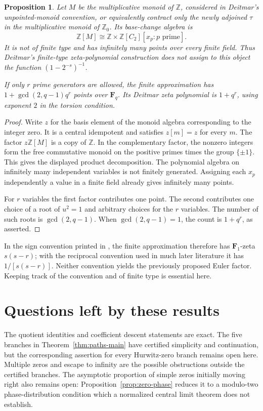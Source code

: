 \documentclass[11pt]{article}
\newcommand{\Z}{\mathbb Z}\newcommand{\N}{\mathbb N}\newcommand{\Q}{\mathbb Q}
\newtheorem{proposition}[theorem]{Proposition}
\theoremstyle{definition}\newtheorem{definition}[theorem]{Definition}
\begin{document}
\begin{proposition}\label{prop:deitmar}
Let $M$ be the multiplicative monoid of $\Z$, considered in Deitmar's unpointed-monoid convention, or equivalently contract only the newly adjoined $\tau$ in the multiplicative monoid of $\Z_0$. Its base-change algebra is
\[
 \Z[M]\cong\Z\times\Z[C_2][x_p:p\text{ prime}].
\]
It is not of finite type and has infinitely many points over every finite field. Thus Deitmar's finite-type zeta-polynomial construction does not assign to this object the function $(1-2^{-s})^{-1}$.

If only $r$ prime generators are allowed, the finite approximation has $1+\gcd(2,q-1)q^r$ points over $\mathbf F_q$. Its Deitmar zeta polynomial is $1+q^r$, using exponent $2$ in the torsion condition.
\end{proposition}
\begin{proof}
Write $z$ for the basis element of the monoid algebra corresponding to the integer zero. It is a central idempotent and satisfies $z[m]=z$ for every $m$. The factor $z\Z[M]$ is a copy of $\Z$. In the complementary factor, the nonzero integers form the free commutative monoid on the positive primes times the group $\{\pm1\}$. This gives the displayed product decomposition. The polynomial algebra on infinitely many independent variables is not finitely generated. Assigning each $x_p$ independently a value in a finite field already gives infinitely many points.

For $r$ variables the first factor contributes one point. The second contributes one choice of a root of $u^2=1$ and arbitrary choices for the $r$ variables. The number of such roots is $\gcd(2,q-1)$. When $\gcd(2,q-1)=1$, the count is $1+q^r$, as asserted.
\end{proof}

In the sign convention printed in \citet[p.\ 1]{Deitmar}, the finite approximation therefore has $\mathbf F_1$-zeta $s(s-r)$; with the reciprocal convention used in much later literature it has $1/[s(s-r)]$. Neither convention yields the previously proposed Euler factor. Keeping track of the convention and of finite type is essential here.

\section{Questions left by these results}
The quotient identities and coefficient descent statements are exact. The five branches in Theorem~\ref{thm:paths-main} have certified simplicity and continuation, but the corresponding assertion for every Hurwitz-zero branch remains open here. Multiple zeros and escape to infinity are the possible obstructions outside the certified branches. The asymptotic proportion of simple zeros initially moving right also remains open: Proposition~\ref{prop:zero-phase} reduces it to a modulo-two phase-distribution condition which a normalized central limit theorem does not establish.
\end{document}

